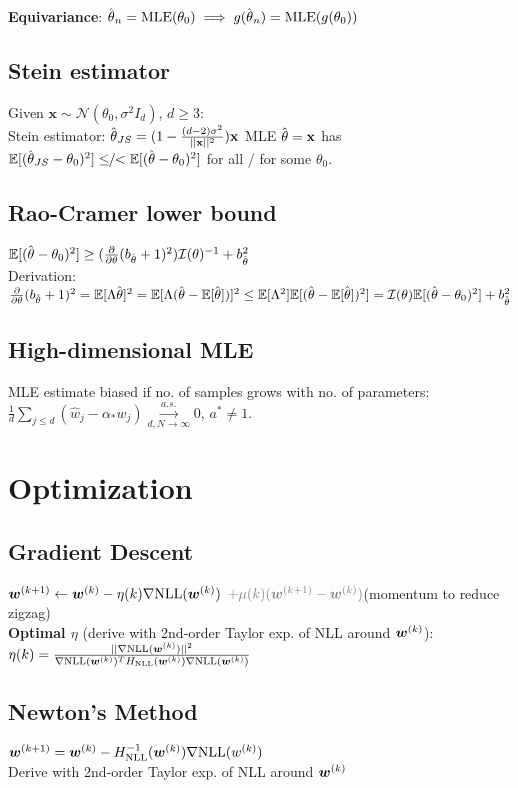 \textbf{Equivariance}:
$\hat{\kern0pt \theta}_n = \textrm{MLE}(\theta_0) \implies g(\hat{\kern0pt \theta}_n) = \textrm{MLE}(g(\theta_0))$


\subsection*{Stein estimator}
Given $\mathbf{x} \sim \mathcal{N}(\theta_0, \sigma^2I_d)$, $d\geq3$:\\
Stein estimator: $\hat{\kern0pt \theta}_{JS} = (1-\frac{(d-2)\sigma^2}{||\mathbf{x}||^2})\mathbf{x}$
MLE $\hat{\kern0pt \theta} = \mathbf{x}$ has $\mathbb{E}[(\hat{\kern0pt \theta}_{JS} - \theta_0)^2] \leq\!\!/\!\!< \mathbb{E}[(\hat{\kern0pt \theta} - \theta_0)^2]$ for all / for some $\theta_0$.

% 
% 
\subsection*{Rao-Cramer lower bound}    
$\mathbb{E}[(\hat{\kern0pt \theta} - \theta_0)^2] \geq (\frac{\partial}{\partial\theta}(b_{\hat{\kern0pt \theta}}+1)^2)\mathcal{I}(\theta)^{-1} + b_{\hat{\kern0pt \theta}}^2$\\
Derivation: 
$\frac{\partial}{\partial\theta}(b_{\hat{\kern0pt \theta}}+1)^2 = 
 \mathbb{E}[\Lambda\hat{\kern0pt \theta}]^2 = \mathbb{E}[\Lambda(\hat{\kern0pt \theta} - \mathbb{E}[\hat{\kern0pt \theta}])]^2 \leq \mathbb{E}[\Lambda^2]\mathbb{E}[(\hat{\kern0pt \theta}-\mathbb{E}[\hat{\kern0pt \theta}])^2] = \mathcal{I}(\theta)\mathbb{E}[(\hat{\kern0pt \theta} - \theta_0)^2] + b_{\hat{\kern0pt \theta}}^2
$

\subsection*{High-dimensional MLE}
MLE estimate biased if no. of samples grows with no. of parameters:
$\frac{1}{d}\sum_{j\leq d}(\hat w_j-\alpha_* w_j)\overset{a.s.}{\underset{d,N\to\infty}{\to}}0$, $a^* \neq 1$.

\section*{Optimization}
\subsection*{Gradient Descent}
${\bm{w}}^{(k+1)} \leftarrow {\bm{w}}^{(k)} - \eta(k)\nabla\mathrm{NLL}({\bm{w}}^{(k)})$ {\color{gray}  $\color{gray}+ \mu(k)(\vw^{(k+1)} - \vw^{(k)})$}(momentum to reduce zigzag)\\
\textbf{Optimal $\eta$} (derive with 2nd-order Taylor exp. of NLL around ${\bm{w}}^{(k)}$):\\
$\eta(k)=\frac{||\nabla\mathrm{NLL}({\bm{w}}^{(k)})||^2}{\nabla\mathrm{NLL}({\bm{w}}^{(k)})^TH_{\mathrm{NLL}}({\bm{w}}^{(k)})\nabla\mathrm{NLL}({\bm{w}}^{(k)})}$

\subsection*{Newton's Method}
\mbox{${\bm{w}}^{(k+1)}={\bm{w}}^{(k)} - H_{\mathrm{NLL}}^{-1}({\bm{w}}^{(k)})\nabla\mathrm{NLL}(w^{(k)})$}\\
Derive with 2nd-order Taylor exp. of NLL around ${\bm{w}}^{(k)}$